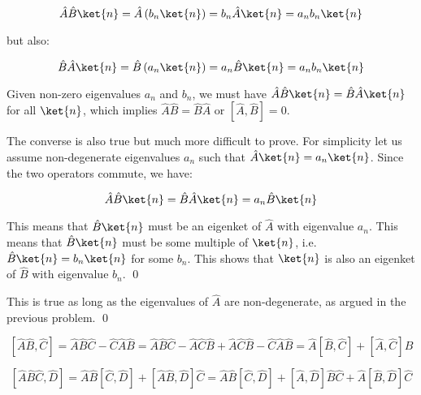 \documentclass[12pt]{article}
\begin{document}
\begin{equation}
    \hat{A} \hat{B} \ket{n} = \hat{A} \left( b_{n} \ket{n} \right) = b_{n} \hat{A} \ket{n} = a_{n} b_{n} \ket{n}
\end{equation}

but also:

\begin{equation}
    \hat{B} \hat{A} \ket{n} = \hat{B} \left( a_{n} \ket{n} \right) = a_{n} \hat{B} \ket{n} = a_{n} b_{n} \ket{n}
\end{equation}

Given non-zero eigenvalues $a_{n}$ and $b_{n}$, we must have $\hat{A} \hat{B} \ket{n} = \hat{B} \hat{A} \ket{n}$ for all $\ket{n}$, which implies $\hat{A} \hat{B} = \hat{B} \hat{A}$ or $[\hat{A}, \hat{B}] = 0$.

The converse is also true but much more difficult to prove. For simplicity let us assume non-degenerate eigenvalues $a_{n}$ such that $\hat{A} \ket{n} = a_{n} \ket{n}$. Since the two operators commute, we have:

\begin{equation}
    \hat{A} \hat{B} \ket{n} = \hat{B} \hat{A} \ket{n} = a_{n} \hat{B} \ket{n}
\end{equation}

This means that $\hat{B} \ket{n}$ must be an eigenket of $\hat{A}$ with eigenvalue $a_{n}$. This means that $\hat{B} \ket{n}$ must be some multiple of $\ket{n}$, i.e. $\hat{B} \ket{n} = b_{n} \ket{n}$ for some $b_{n}$. This shows that $\ket{n}$ is also an eigenket of $\hat{B}$ with eigenvalue $b_{n}$.
\qed


This is true as long as the eigenvalues of $\hat{A}$ are non-degenerate, as argued in the previous problem.
\qed




\begin{equation}
    \left[ \hat{A} \hat{B}, \hat{C} \right] = \hat{A} \hat{B} \hat{C} - \hat{C} \hat{A} \hat{B} = \hat{A} \hat{B} \hat{C} - \hat{A} \hat{C} \hat{B} + \hat{A} \hat{C} \hat{B} - \hat{C} \hat{A} \hat{B} = \hat{A} \left[ \hat{B}, \hat{C} \right] + \left[ \hat{A}, \hat{C} \right] \hat{B}
\end{equation}


\begin{equation}
    \left[ \hat{A} \hat{B} \hat{C}, \hat{D} \right] = \hat{A} \hat{B} \left[ \hat{C}, \hat{D} \right] + \left[ \hat{A} \hat{B}, \hat{D} \right] \hat{C} = \hat{A} \hat{B} \left[ \hat{C}, \hat{D} \right] + \left[ \hat{A}, \hat{D} \right] \hat{B} \hat{C} + \hat{A} \left[ \hat{B}, \hat{D} \right] \hat{C}
\end{equation}
\end{document}
